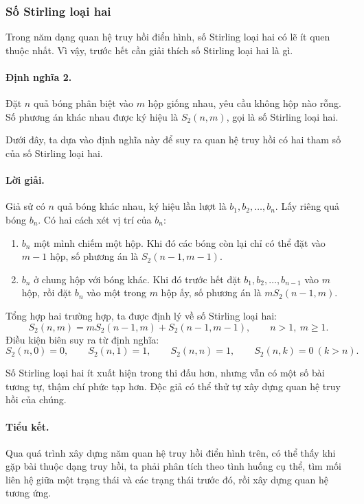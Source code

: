 \documentclass[11pt]{article}
\begin{document}
\subsubsection{Số Stirling loại hai}

Trong năm dạng quan hệ truy hồi điển hình, số Stirling loại hai có lẽ ít
quen thuộc nhất. Vì vậy, trước hết cần giải thích số Stirling loại hai là gì.

\paragraph{Định nghĩa 2.}
Đặt \(n\) quả bóng phân biệt vào \(m\) hộp giống nhau, yêu cầu không hộp nào
rỗng. Số phương án khác nhau được ký hiệu là \(S_2(n,m)\), gọi là số Stirling
loại hai.

Dưới đây, ta dựa vào định nghĩa này để suy ra quan hệ truy hồi có hai tham số
của số Stirling loại hai.

\paragraph{Lời giải.}
Giả sử có \(n\) quả bóng khác nhau, ký hiệu lần lượt là
\(b_1,b_2,\ldots,b_n\). Lấy riêng quả bóng \(b_n\). Có hai cách xét vị trí
của \(b_n\):
\begin{enumerate}
  \item \(b_n\) một mình chiếm một hộp. Khi đó các bóng còn lại chỉ có thể
  đặt vào \(m-1\) hộp, số phương án là \(S_2(n-1,m-1)\).
  \item \(b_n\) ở chung hộp với bóng khác. Khi đó trước hết đặt
  \(b_1,b_2,\ldots,b_{n-1}\) vào \(m\) hộp, rồi đặt \(b_n\) vào một trong
  \(m\) hộp ấy, số phương án là \(mS_2(n-1,m)\).
\end{enumerate}
Tổng hợp hai trường hợp, ta được định lý về số Stirling loại hai:
\[
  S_2(n,m)=mS_2(n-1,m)+S_2(n-1,m-1),
  \qquad n>1,\ m\ge1.
\]
Điều kiện biên suy ra từ định nghĩa:
\[
  S_2(n,0)=0,\qquad S_2(n,1)=1,\qquad
  S_2(n,n)=1,\qquad S_2(n,k)=0\ (k>n).
\]

Số Stirling loại hai ít xuất hiện trong thi đấu hơn, nhưng vẫn có một số bài
tương tự, thậm chí phức tạp hơn. Độc giả có thể thử tự xây dựng quan hệ truy
hồi của chúng.

\paragraph{Tiểu kết.}
Qua quá trình xây dựng năm quan hệ truy hồi điển hình trên, có thể thấy khi
gặp bài thuộc dạng truy hồi, ta phải phân tích theo tình huống cụ thể, tìm
mối liên hệ giữa một trạng thái và các trạng thái trước đó, rồi xây dựng quan
hệ tương ứng.
\end{document}
